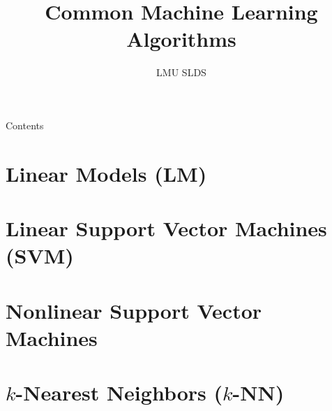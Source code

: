 





\title{Common Machine Learning Algorithms}
\author{LMU SLDS}
\date{}

\newcommand{\titlefigure}{figure_man/mckenzie_ai}
\newcommand{\titlefiguresize}{0.6}
\newcommand{\titlefiguresource}{https://www.vpnsrus.com/}







\lecturechapter{}

\begin{frame}{Contents}
  \tableofcontents
\end{frame}

\footnotesize

\section{Linear Models (LM)}


% 

\section{Linear Support Vector Machines (SVM)}


\section{Nonlinear Support Vector Machines}


\section{$k$-Nearest Neighbors ($k$-NN)}


